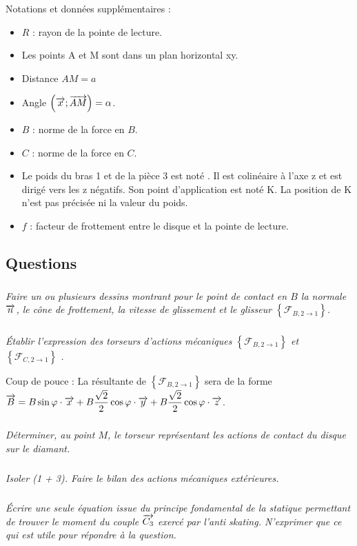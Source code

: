 \documentclass[10pt]{article}
\begin{document}
Notations et données supplémentaires : 
\begin{itemize}
\item $R$ : rayon de la pointe de lecture.
\item Les points A et M sont dans un plan horizontal xy.
\item Distance $AM = a$
\item Angle $\left(\overrightarrow{x};\overrightarrow{AM} \right)= \alpha$.
\item $B$ : norme de la force en $B$.
\item $C$ : norme de la force en $C$.
\item Le poids du bras 1 et de la pièce 3 est noté  . Il est colinéaire à l'axe z et est dirigé vers les z négatifs. Son point d'application est noté K. La position de K n'est pas précisée ni la valeur du poids.
\item $f$ : facteur de frottement entre le disque et la pointe de lecture.
\end{itemize}

\subsection*{Questions}

\subparagraph{} \textit{Faire un ou plusieurs dessins montrant pour le point de contact en $B$ la normale $\overrightarrow{n}$, le cône de frottement, la vitesse de glissement et le glisseur $\left\{ \mathcal{F}_{B,2\rightarrow 1}\right\}$.}

\subparagraph{} \textit{Établir l'expression des torseurs d'actions mécaniques
 $\left\{ \mathcal{F}_{B,2\rightarrow 1}\right\}$ et
 $\left\{ \mathcal{F}_{C,2\rightarrow 1}\right\}$ .}

\begin{rem}
Coup de pouce : 
La résultante de $\left\{ \mathcal{F}_{B,2\rightarrow 1}\right\}$ sera de la forme $\overrightarrow{B} = B\sin \varphi \cdot \overrightarrow{x} +  B\dfrac{\sqrt{2}}{2} \cos \varphi  \cdot \overrightarrow{y} +  B\dfrac{\sqrt{2}}{2} \cos \varphi  \cdot \overrightarrow{z}$.
\end{rem}


\subparagraph{} \textit{Déterminer, au point $M$, le torseur représentant les actions de contact du disque sur le diamant.}

\subparagraph{} \textit{Isoler (1 + 3). Faire le bilan des actions mécaniques extérieures.}


\subparagraph{} \textit{Écrire une seule équation issue du principe fondamental de la statique permettant de trouver le moment du couple $\overrightarrow{C_3}$  exercé par l'anti skating. N'exprimer que ce qui est utile pour répondre à la question.}
\end{document}
